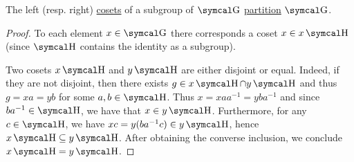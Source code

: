 \begin{proposition}\label{thm:coset_partition}
  The left (resp. right) \hyperref[def:group_cosets]{cosets} of a subgroup of \( \CG \) \hyperref[def:set_partition]{partition} \( \CG \).
\end{proposition}
\begin{proof}
  To each element \( x \in \CG \) there corresponds a coset \( x \in x\CH \) (since \( \CH \) contains the identity as a subgroup).

  Two cosets \( x\CH \) and \( y\CH \) are either disjoint or equal. Indeed, if they are not disjoint, then there exists \( g \in x\CH \cap y\CH \) and thus \( g = xa = yb \) for some \( a, b \in \CH \). Thus \( x = x a a^{-1} = y b a^{-1} \) and since \( b a^{-1} \in \CH \), we have that \( x \in y\CH \). Furthermore, for any \( c \in \CH \), we have \( xc = y(b a^{-1} c) \in y\CH \), hence \( x\CH \subseteq y\CH \). After obtaining the converse inclusion, we conclude \( x\CH = y\CH \).
\end{proof}

